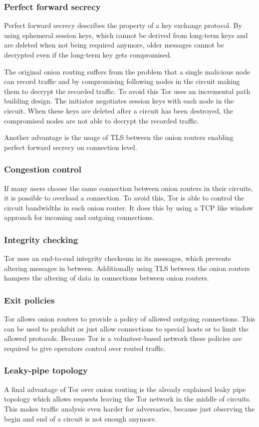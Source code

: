 \subsubsection{Perfect forward secrecy} 
Perfect forward secrecy describes the property of a key exchange protocol. By using ephemeral session keys, which cannot be derived from long-term keys and are deleted when not being required anymore, older messages cannot be decrypted even if the long-term key gets compromised.

The original onion routing suffers from the problem that a single malicious node can record traffic and by compromising following nodes in the circuit making them to decrypt the recorded traffic. 
To avoid this Tor uses an incremental path building design. The initiator negotiates session keys with each node in the circuit. When these keys are deleted after a circuit has been destroyed, the compromised nodes are not able to decrypt the recorded traffic.

Another advantage is the usage of TLS between the onion routers enabling perfect forward secrecy on connection level.

\subsubsection{Congestion control} 
If many users choose the same connection between onion routers in their circuits, it is possible to overload a connection. To avoid this, Tor is able to control the circuit bandwidths in each onion router. It does this by using a TCP like window approach for incoming and outgoing connections.

\subsubsection{Integrity checking} 
Tor uses an end-to-end integrity checksum in its messages, which prevents altering messages in between. Additionally using TLS between the onion routers hampers the altering of data in connections between onion routers.

\subsubsection{Exit policies}
Tor allows onion routers to provide a policy of allowed outgoing connections. This can be used to prohibit or just allow connections to special hosts or to limit the allowed protocols. Because Tor is a volunteer-based network these policies are required to give operators control over routed traffic.

\subsubsection{Leaky-pipe topology}
A final advantage of Tor over onion routing is the already explained leaky pipe topology which allows requests leaving the Tor network in the middle of circuits. This makes traffic analysis even harder for adversaries, because just observing the begin and end of a circuit is not enough anymore.